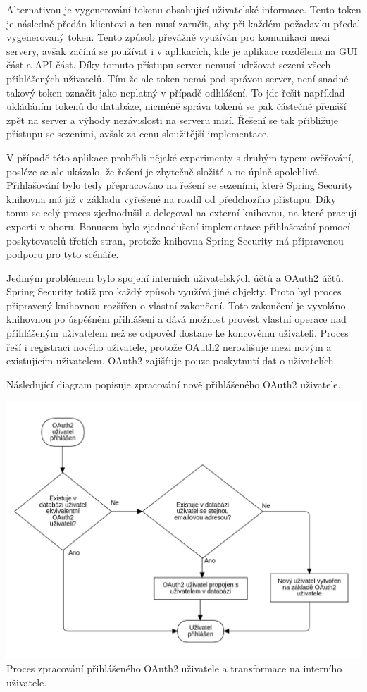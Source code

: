 \begin{itemize}
\begin{itemize}
			Alternativou je vygenerování tokenu obsahující uživatelské informace.
			Tento token je následně předán klientovi a ten musí zaručit, aby při každém požadavku předal vygenerovaný token.
			Tento způsob převážně využíván pro komunikaci mezi servery, avšak začíná se používat i v aplikacích, kde
			je aplikace rozdělena na \ac{GUI} část a \ac{API} část.
			Díky tomuto přístupu server nemusí udržovat sezení všech přihlášených uživatelů.
			Tím že ale token nemá pod správou server, není snadné takový token označit jako neplatný v případě odhlášení.
			To jde řešit například ukládáním tokenů do databáze, nicméně správa tokenů se pak částečně přenáší zpět
			na server a výhody nezávislosti na serveru mizí.
			Řešení se tak přibližuje přístupu se sezeními, avšak za cenu sloužitější implementace.

			V případě této aplikace proběhli nějaké experimenty s druhým typem ověřování, posléze se ale ukázalo, že
			řešení je zbytečně složité a ne úplně spolehlivé.
			Přihlašování bylo tedy přepracováno na řešení se sezeními, které Spring Security knihovna má již v základu
			vyřešené na rozdíl od předchozího přístupu.
			Díky tomu se celý proces zjednodušil a delegoval na externí knihovnu, na které pracují experti v oboru.
			Bonusem bylo zjednodušení implementace přihlašování pomocí poskytovatelů třetích stran, protože
			knihovna Spring Security má připravenou podporu pro tyto scénáře.

			Jediným problémem bylo spojení interních uživatelských účtů a OAuth2 účtů.
			Spring Security totiž pro každý způsob využívá jiné objekty.
			Proto byl proces připravený knihovnou rozšířen o vlastní zakončení.
			Toto zakončení je vyvoláno knihovnou po úspěšném přihlášení a dává možnost provést vlastní operace nad
			přihlášeným uživatelem než se odpověď dostane ke koncovému uživateli.
			Proces řeší i registraci nového uživatele, protože OAuth2 nerozlišuje mezi novým a existujícím uživatelem.
			OAuth2 zajišťuje pouze poskytnutí dat o uživatelích.

			Následující diagram popisuje zpracování nově přihlášeného OAuth2 uživatele.

			\includegraphics{obrazky/proces_prihlaseni_oauth2}\hfill
			Proces zpracování přihlášeného OAuth2 uživatele a transformace na interního uživatele. %


\end{itemize}
\end{itemize}
